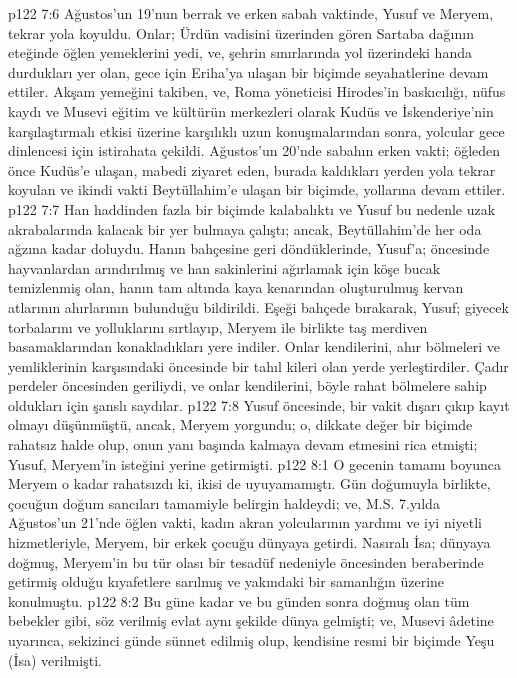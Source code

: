 \vs p122 7:6 Ağustos’un 19’nun berrak ve erken sabah vaktinde, Yusuf ve Meryem, tekrar yola koyuldu. Onlar; Ürdün vadisini üzerinden gören Sartaba dağının eteğinde öğlen yemeklerini yedi, ve, şehrin sınırlarında yol üzerindeki handa durdukları yer olan, gece için Eriha’ya ulaşan bir biçimde seyahatlerine devam ettiler. Akşam yemeğini takiben, ve, Roma yöneticisi Hirodes’in baskıcılığı, nüfus kaydı ve Musevi eğitim ve kültürün merkezleri olarak Kudüs ve İskenderiye’nin karşılaştırmalı etkisi üzerine karşılıklı uzun konuşmalarından sonra, yolcular gece dinlencesi için istirahata çekildi. Ağustos’un 20’nde sabahın erken vakti; öğleden önce Kudüs’e ulaşan, mabedi ziyaret eden, burada kaldıkları yerden yola tekrar koyulan ve ikindi vakti Beytüllahim’e ulaşan bir biçimde, yollarına devam ettiler.
\vs p122 7:7 Han haddinden fazla bir biçimde kalabalıktı ve Yusuf bu nedenle uzak akrabalarında kalacak bir yer bulmaya çalıştı; ancak, Beytüllahim’de her oda ağzına kadar doluydu. Hanın bahçesine geri döndüklerinde, Yusuf’a; öncesinde hayvanlardan arındırılmış ve han sakinlerini ağırlamak için köşe bucak temizlenmiş olan, hanın tam altında kaya kenarından oluşturulmuş kervan atlarının ahırlarının bulunduğu bildirildi. Eşeği bahçede bırakarak, Yusuf; giyecek torbalarını ve yolluklarını sırtlayıp, Meryem ile birlikte taş merdiven basamaklarından konakladıkları yere indiler. Onlar kendilerini, ahır bölmeleri ve yemliklerinin karşısındaki öncesinde bir tahıl kileri olan yerde yerleştirdiler. Çadır perdeler öncesinden geriliydi, ve onlar kendilerini, böyle rahat bölmelere sahip oldukları için şanslı saydılar.
\vs p122 7:8 Yusuf öncesinde, bir vakit dışarı çıkıp kayıt olmayı düşünmüştü, ancak, Meryem yorgundu; o, dikkate değer bir biçimde rahatsız halde olup, onun yanı başında kalmaya devam etmesini rica etmişti; Yusuf, Meryem’in isteğini yerine getirmişti.
\vs p122 8:1 O gecenin tamamı boyunca Meryem o kadar rahatsızdı ki, ikisi de uyuyamamıştı. Gün doğumuyla birlikte, çocuğun doğum sancıları tamamiyle belirgin haldeydi; ve, M.S. 7.yılda Ağustos’un 21’nde öğlen vakti, kadın akran yolcularının yardımı ve iyi niyetli hizmetleriyle, Meryem, bir erkek çocuğu dünyaya getirdi. Nasıralı İsa; dünyaya doğmuş, Meryem’in bu tür olası bir tesadüf nedeniyle öncesinden beraberinde getirmiş olduğu kıyafetlere sarılmış ve yakındaki bir samanlığın üzerine konulmuştu.
\vs p122 8:2 Bu güne kadar ve bu günden sonra doğmuş olan tüm bebekler gibi, söz verilmiş evlat aynı şekilde dünya gelmişti; ve, Musevi âdetine uyarınca, sekizinci günde sünnet edilmiş olup, kendisine resmi bir biçimde Yeşu (İsa) verilmişti.
